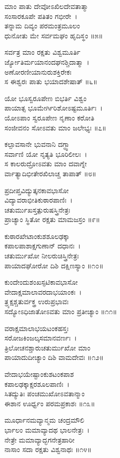 ಮಾಂ ಪಾತು ದೇವೋಽಖಿಲದೇವತಾತ್ಮಾ\\ಸಂಸಾರಕೂಪೇ ಪತಿತಂ ಗಭೀರೇ~।\\
ತನ್ನಾಮ ದಿವ್ಯಂ ಪರಮಂತ್ರಮೂಲಂ\\ಧುನೋತು ಮೇ ಸರ್ವಮಘಂ ಹೃದಿಸ್ಥಂ ॥೫॥

ಸರ್ವತ್ರ ಮಾಂ ರಕ್ಷತು ವಿಶ್ವಮೂರ್ತಿ\\ರ್ಜ್ಯೋತಿರ್ಮಯಾನಂದಘನಶ್ಚಿದಾತ್ಮಾ~।\\
ಅಣೋರಣೀಯಾನುರುಶಕ್ತಿರೇಕಃ\\ಸ ಈಶ್ವರಃ ಪಾತು ಭಯಾದಶೇಷಾತ್ ॥೬॥

ಯೋ ಭೂಸ್ವರೂಪೇಣ ಬಿಭರ್ತಿ ವಿಶ್ವಂ\\ಪಾಯಾತ್ಸ ಭೂಮೇರ್ಗಿರಿಶೋಽಷ್ಟಮೂರ್ತಿಃ~।\\
ಯೋಽಪಾಂ ಸ್ವರೂಪೇಣ ನೃಣಾಂ ಕರೋತಿ\\ಸಂಜೀವನಂ ಸೋಽವತು ಮಾಂ ಜಲೇಭ್ಯಃ ॥೭॥

ಕಲ್ಪಾವಸಾನೇ ಭುವನಾನಿ ದಗ್ಧ್ವಾ\\ಸರ್ವಾಣಿ ಯೋ ನೃತ್ಯತಿ ಭೂರಿಲೀಲಃ~।\\
ಸ ಕಾಲರುದ್ರೋಽವತು ಮಾಂ ದವಾಗ್ನೇ\\ರ್ವಾತ್ಯಾದಿಭೀತೇರಖಿಲಾಚ್ಚ ತಾಪಾತ್ ॥೮॥

ಪ್ರದೀಪ್ತವಿದ್ಯುತ್ಕನಕಾವಭಾಸೋ\\ವಿದ್ಯಾವರಾಭೀತಿಕುಠಾರಪಾಣಿಃ~।\\
ಚತುರ್ಮುಖಸ್ತತ್ಪುರುಷಸ್ತ್ರಿನೇತ್ರಃ\\ಪ್ರಾಚ್ಯಾಂ ಸ್ಥಿತೋ ರಕ್ಷತು ಮಾಮಜಸ್ರಂ ॥೯॥

ಕುಠಾರಖೇಟಾಂಕುಶಶೂಲಢಕ್ಕಾ\\ಕಪಾಲಪಾಶಾಕ್ಷಗುಣಾನ್ ದಧಾನಃ~।\\
ಚತುರ್ಮುಖೋ ನೀಲರುಚಿಸ್ತ್ರಿನೇತ್ರಃ\\ಪಾಯಾದಘೋರೋ ದಿಶಿ ದಕ್ಷಿಣಸ್ಯಾಂ ॥೧೦॥

ಕುಂದೇಂದುಶಂಖಸ್ಫಟಿಕಾವಭಾಸೋ\\ವೇದಾಕ್ಷಮಾಲಾವರದಾಭಯಾಂಕಃ~।\\
ತ್ರ್ಯಕ್ಷಶ್ಚತುರ್ವಕ್ತ್ರ ಉರುಪ್ರಭಾವಃ\\ಸದ್ಯೋಽಧಿಜಾತೋಽವತು ಮಾಂ ಪ್ರತೀಚ್ಯಾಂ ॥೧೧॥

 ವರಾಕ್ಷಮಾಲಾಭಯಟಂಕಹಸ್ತಃ\\ಸರೋಜಕಿಂಜಲ್ಕಸಮಾನವರ್ಣಃ~।\\
ತ್ರಿಲೋಚನಶ್ಚಾರುಚತುರ್ಮುಖೋ ಮಾಂ\\ಪಾಯಾದುದೀಚ್ಯಾಂ ದಿಶಿ ವಾಮದೇವಃ ॥೧೨॥

ವೇದಾಭಯೇಷ್ಟಾಂಕುಶಟಂಕಪಾಶ\\ಕಪಾಲಢಕ್ಕಾಕ್ಷರಶೂಲಪಾಣಿಃ~।\\
ಸಿತದ್ಯುತಿಃ ಪಂಚಮುಖೋಽವತಾನ್ಮಾಂ\\ಈಶಾನ ಊರ್ಧ್ವಂ ಪರಮಪ್ರಕಾಶಃ ॥೧೩॥

ಮೂರ್ಧಾನಮವ್ಯಾನ್ಮಮ ಚಂದ್ರಮೌಲಿ\\ರ್ಭಾಲಂ ಮಮಾವ್ಯಾದಥ ಭಾಲನೇತ್ರಃ~।\\
ನೇತ್ರೇ ಮಮಾವ್ಯಾದ್ಭಗನೇತ್ರಹಾರೀ\\ನಾಸಾಂ ಸದಾ ರಕ್ಷತು ವಿಶ್ವನಾಥಃ ॥೧೪॥

